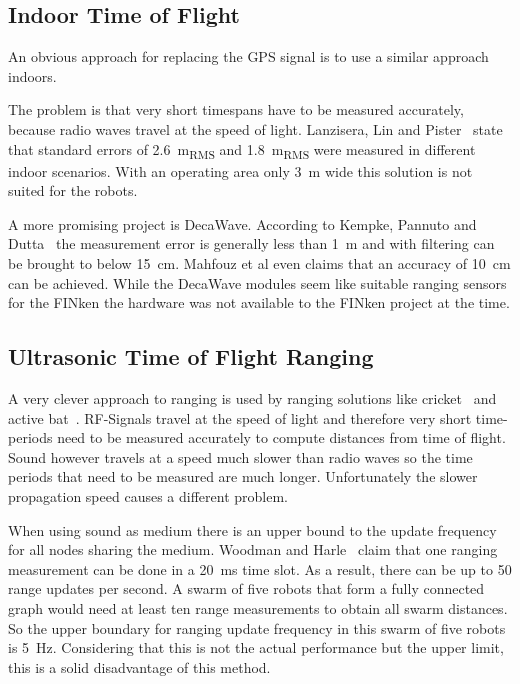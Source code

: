 
\subsection{Indoor Time of Flight}
An obvious approach for replacing the GPS signal is to use a similar approach indoors.

The problem is that very short timespans have to be measured accurately, because radio waves travel at the speed of light.
Lanzisera, Lin and Pister~\cite{lanzisera2006} state that standard errors of \SI{2.6}{\metre_{RMS}} and \SI{1.8}{\metre_{RMS}} were measured in different indoor scenarios.
With an operating area only \SI{3}{\metre} wide this solution is not suited for the robots.

A more promising project is DecaWave.
According to Kempke, Pannuto and Dutta~\cite{uwb_localisation_copter} the measurement error is generally less than \SI{1}{\metre} and with filtering can be brought to below \SI{15}{\centi\metre}.
Mahfouz et al\cite{uwb_decawave} even claims that an accuracy of \SI{10}{\centi\metre} can be achieved.
While the DecaWave modules seem like suitable ranging sensors for the FINken the hardware was not available to the FINken project at the time.

\subsection{Ultrasonic Time of Flight Ranging}
A very clever approach to ranging is used by ranging solutions like cricket~\cite{cricket_01} and active bat~\cite{active_bat}. 
RF-Signals travel at the speed of light and therefore very short time-periods need to be measured accurately to compute distances from time of flight.
Sound however travels at a speed much slower than radio waves so the time periods that need to be measured are much longer.
Unfortunately the slower propagation speed causes a different problem.

When using sound as medium there is an upper bound to the update frequency for all nodes sharing the medium. Woodman and Harle~\cite{active_bat} claim that one ranging measurement can be done in a \SI{20}{\milli\second} time slot.
As a result, there can be up to 50 range updates per second.
A swarm of five robots that form a fully connected graph would need at least ten range measurements to obtain all swarm distances.
So the upper boundary for ranging update frequency in this swarm of five robots is \SI{5}{\hertz}.
Considering that this is not the actual performance but the upper limit, this is a solid disadvantage of this method.

